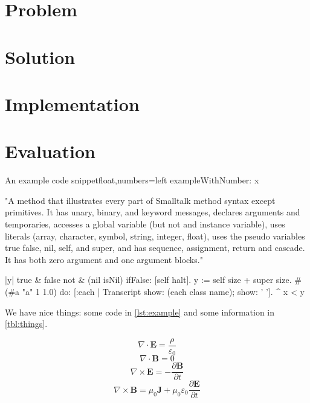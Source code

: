 \section{Problem}
\label{sec:problem}


\section{Solution}
\label{sec:solution}


\section{Implementation}
\label{sec:implementation}


\section{Evaluation}
\label{sec:evaluation}

\lstset{language=Smalltalk}
\begin{code}{An example code snippet}{float,numbers=left}
exampleWithNumber: x

"A method that illustrates every part of Smalltalk method syntax
except primitives. It has unary, binary, and keyword messages,
declares arguments and temporaries, accesses a global variable
(but not and instance variable), uses literals (array, character,
symbol, string, integer, float), uses the pseudo variables
true false, nil, self, and super, and has sequence, assignment,
return and cascade. It has both zero argument and one argument blocks."

    |y|
    true & false not & (nil isNil) ifFalse: [self halt].
    y := self size + super size.
    #(#a "a" 1 1.0)
        do: [:each | Transcript show: (each class name);
                                 show: ' '].
     ^ x < y
\end{code}


We have nice things: some code in \autoref{lst:example} and some information
in \autoref{tbl:things}.

\[\nabla \cdot \mathbold{E} = \frac{\rho}{\varepsilon_0}\]
\[\nabla \cdot \mathbold{B} = 0\]
\[\nabla \times \mathbold{E} = -\frac {\partial \mathbold{B}}{\partial t}\]
\[\nabla \times \mathbold{B} = \mu_0 \mathbold{J} + \mu_0\varepsilon_0  \frac{\partial \mathbold{E}}{\partial t}\]


